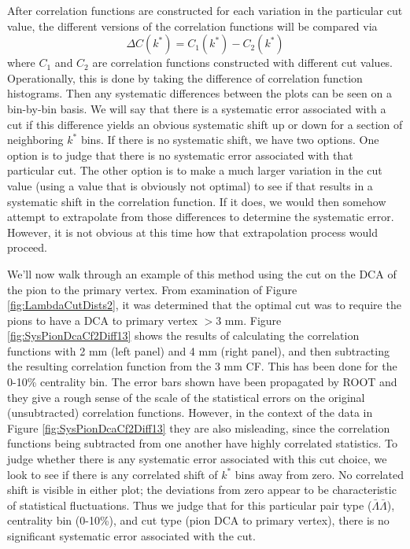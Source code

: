 After correlation functions are constructed for each variation in the particular cut value, the different versions of the correlation functions will be compared via
\begin{equation}
\label{eqn:SysReconCfDiff}
\Delta C(k^*) = C_1(k^*)-C_2(k^*)
\end{equation}
where $C_1$ and $C_2$ are correlation functions constructed with different cut values.  Operationally, this is done by taking the difference of correlation function histograms.  Then any systematic differences between the plots can be seen on a bin-by-bin basis.  We will say that there is a systematic error associated with a cut if this difference yields an obvious systematic shift up or down for a section of neighboring $k^*$ bins.  If there is no systematic shift, we have two options.  One option is to judge that there is no systematic error associated with that particular cut.  The other option is to make a much larger variation in the cut value (using a value that is obviously not optimal) to see if that results in a systematic shift in the correlation function.  If it does, we would then somehow attempt to extrapolate from those differences to determine the systematic error.  However, it is not obvious at this time how that extrapolation process would proceed.

We'll now walk through an example of this method using the cut on the DCA of the pion to the primary vertex.  From examination of Figure \ref{fig:LambdaCutDists2}, it was determined that the optimal cut was to require the pions to have a DCA to primary vertex $> 3$ mm. Figure \ref{fig:SysPionDcaCf2Diff13} shows the results of calculating the correlation functions with 2 mm (left panel) and 4 mm (right panel), and then subtracting the resulting correlation function from the 3 mm CF.  This has been done for the 0-10\% centrality bin.  The error bars shown have been propagated by ROOT and they give a rough sense of the scale of the statistical errors on the original (unsubtracted) correlation functions.  However, in the context of the data in Figure \ref{fig:SysPionDcaCf2Diff13} they are also misleading, since the correlation functions being subtracted from one another have highly correlated statistics.  To judge whether there is any systematic error associated with this cut choice, we look to see if there is any correlated shift of $k^*$ bins away from zero.  No correlated shift is visible in either plot; the deviations from zero appear to be characteristic of statistical fluctuations.  Thus we judge that for this particular pair type ($\bar{\Lambda}\bar{\Lambda}$), centrality bin (0-10\%), and cut type (pion DCA to primary vertex), there is no significant systematic error associated with the cut.

